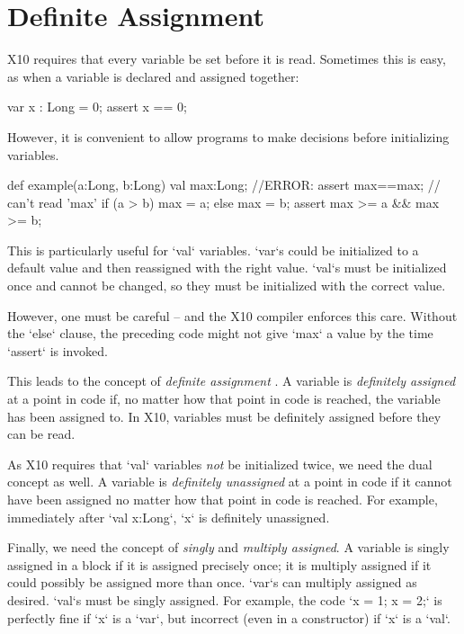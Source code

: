 \chapter{Definite Assignment}
\label{sect:DefiniteAssignment}

X10 requires that every variable be set before it is read.
Sometimes this is easy, as when a variable is declared and assigned together: 
\begin{xten}
  var x : Long = 0;
  assert x == 0;
\end{xten}
However, it is convenient to allow programs to make decisions before
initializing variables.
\begin{xten}
def example(a:Long, b:Long) {
  val max:Long;
  //ERROR: assert max==max; // can't read 'max'
  if (a > b) max = a;
  else max = b;
  assert max >= a && max >= b;
}
\end{xten}
This is particularly useful for \xcd`val` variables.  \xcd`var`s could be
initialized to a default value and then reassigned with the right value.
\xcd`val`s must be initialized once and cannot be changed, so they must be
initialized with the correct value. 

However, one must be careful -- and the X10 compiler enforces this care.
Without the \xcd`else` clause, the preceding code might not give \xcd`max` a
value by the time \xcd`assert` is invoked.  

This leads to the concept of {\em definite assignment} \cite{jls2}.
A variable is {\em definitely assigned} at a point in code if, no matter how that
point in code is reached, the variable has been assigned to.  In X10,
variables must be definitely assigned before they can be read.


As X10 requires that \xcd`val` variables {\em not} be initialized
twice,  we need the dual concept as well.  A variable is {\em definitely
unassigned} at a point in code if it cannot have been assigned no
matter how that point in code is reached.  For example, immediately
after \xcd`val x:Long`, \xcd`x` is definitely unassigned.  

Finally, we need the concept of {\em singly} and {\em multiply assigned}.
A variable is singly assigned in a block if it is assigned precisely
once; it is multiply assigned if it could possibly be assigned more than once.  
\xcd`var`s can  multiply assigned as desired. \xcd`val`s must be singly
assigned.  For example, the code \xcd`x = 1; x = 2;` is perfectly fine if
\xcd`x` is a \xcd`var`, but incorrect (even in a constructor) if \xcd`x` is a
\xcd`val`.  

